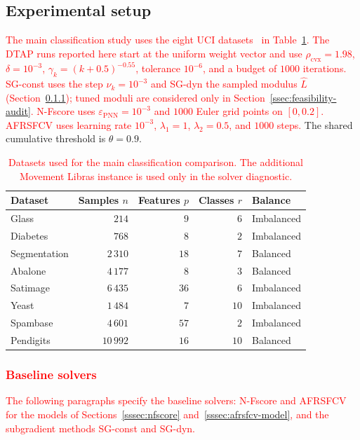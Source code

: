 \documentclass[]{interact}
\theoremstyle{plain}
\theoremstyle{definition}
\theoremstyle{remark}
\newcommand{\cvx}{\mathrm{cvx}}
\begin{document}
\subsection{Experimental setup}\label{ssec:setup}
\leavevmode\textcolor{red}{The main classification study uses the eight UCI datasets~\citep{kelly2023uci} in Table~\ref{tab:datasets}. The DTAP runs reported here start at the uniform weight vector and use $\rho_{\cvx}=1.98$, $\delta=10^{-3}$, $\gamma_k=(k+0.5)^{-0.55}$, tolerance $10^{-6}$, and a budget of $1000$ iterations. SG-const uses the step $\nu_k=10^{-3}$ and SG-dyn the sampled modulus $\widehat L$ (Section~\ref{sssec:baselines}); tuned moduli are considered only in Section~\ref{ssec:feasibility-audit}. N-Fscore uses $\varepsilon_{\mathrm{PNN}}=10^{-3}$ and $1000$ Euler grid points on $[0,0.2]$. AFRSFCV uses learning rate $10^{-3}$, $\lambda_1=1$, $\lambda_2=0.5$, and $1000$ steps.} The shared cumulative threshold is $\theta=0.9$.

\begin{table}[htbp]
\centering
\caption{\textcolor{red}{Datasets used for the main classification comparison. The additional Movement Libras instance is used only in the solver diagnostic.}}\label{tab:datasets}
\begin{tabular}{lrrrl}
\toprule
Dataset      & Samples $n$ & Features $p$ & Classes $r$ & Balance    \\
\midrule
Glass        & $214$       & $9$          & $6$         & Imbalanced \\
Diabetes     & $768$       & $8$          & $2$         & Imbalanced \\
Segmentation & $2\,310$    & $18$         & $7$         & Balanced   \\
Abalone      & $4\,177$    & $8$          & $3$         & Balanced   \\
Satimage     & $6\,435$    & $36$         & $6$         & Imbalanced \\
Yeast        & $1\,484$    & $7$          & $10$        & Imbalanced \\
Spambase     & $4\,601$    & $57$         & $2$         & Imbalanced \\
Pendigits    & $10\,992$   & $16$         & $10$        & Balanced   \\
\bottomrule
\end{tabular}
\end{table}
\subsubsection{\textcolor{red}{Baseline solvers}}\label{sssec:baselines}
\leavevmode\textcolor{red}{The following paragraphs specify the baseline solvers: N-Fscore and AFRSFCV for the models of Sections~\ref{sssec:nfscore} and~\ref{sssec:afrsfcv-model}, and the subgradient methods SG-const and SG-dyn.}
\end{document}
